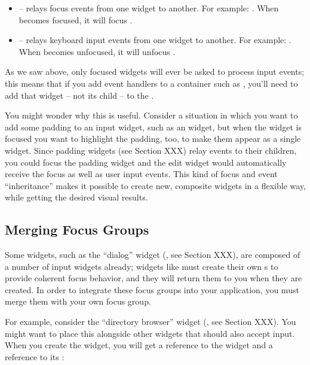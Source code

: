 \begin{itemize}
\item {} -- relays focus events from one widget to
  another.  For example: .
  When  becomes focused, it will focus .
\item {} -- relays keyboard input events from one
  widget to another.  For example: .  When  becomes unfocused, it will unfocus
  .
\end{itemize}

As we saw above, only focused widgets will ever be asked to process
input events; this means that if you add event handlers to a container
such as , you'll need to add that widget -- not its child
-- to the .

You might wonder why this is useful.  Consider a situation in which
you want to add some padding to an input widget, such as an 
widget, but when the  widget is focused you want to highlight
the padding, too, to make them appear as a single widget.  Since
padding widgets (see Section XXX) relay events to their children, you
could focus the padding widget and the edit widget would automatically
receive the focus as well as user input events.  This kind of focus
and event ``inheritance'' makes it possible to create new, composite
widgets in a flexible way, while getting the desired visual results.

\subsection{Merging Focus Groups}
\label{sec:merging_focus_groups}

Some widgets, such as the ``dialog'' widget (, see Section
XXX), are composed of a number of input widgets already; widgets like
 must create their own s to provide coherent
focus behavior, and they will return them to you when they are
created.  In order to integrate these focus groups into your
application, you must merge them with your own focus group.

For example, consider the ``directory browser'' widget
(, see Section XXX).  You might want to place this
alongside other widgets that should also accept input.  When you
create the  widget, you will get a reference to the
widget and a reference to its :

